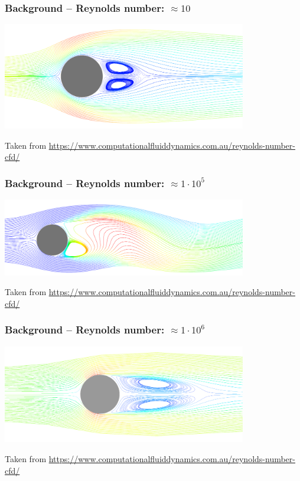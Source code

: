 \begin{frame}
    \frametitle{Background -- Reynolds number: $\approx 10$}
	\vspace*{8mm}
\includegraphics[width=0.8\textwidth, height=.55\textheight]{./Ressourcen/Praesentation/Bilder/Re/re_10.png}

Taken from \url{https://www.computationalfluiddynamics.com.au/reynolds-number-cfd/}
\end{frame}
\clearpage

\begin{frame}
    \frametitle{Background -- Reynolds number: $\approx 1 \cdot 10^5$}
	\vspace*{8mm}
\includegraphics[width=0.8\textwidth, height=.55\textheight]{./Ressourcen/Praesentation/Bilder/Re/re_1e5.png}

Taken from \url{https://www.computationalfluiddynamics.com.au/reynolds-number-cfd/}
\end{frame}
\clearpage

\begin{frame}
    \frametitle{Background -- Reynolds number: $\approx 1 \cdot 10^6$}
	\vspace*{8mm}
\includegraphics[width=0.8\textwidth, height=.55\textheight]{./Ressourcen/Praesentation/Bilder/Re/re_1e6.png}

Taken from \url{https://www.computationalfluiddynamics.com.au/reynolds-number-cfd/}
\end{frame}
\clearpage

